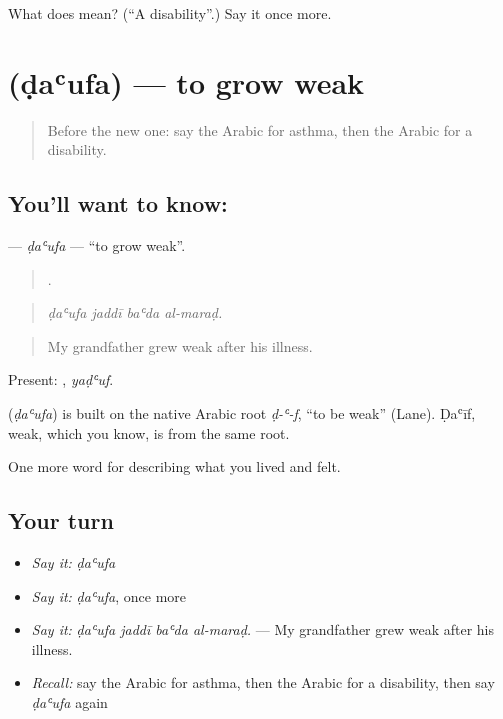 \begin{tcolorbox}[breakable,colback=teal!4,colframe=teal!35!black,title={Before you move on}]
What does  mean? (\textquotedblleft{}A disability\textquotedblright{}.) Say it once more.
\end{tcolorbox}
\section[\texorpdfstring{\ar{ضعف} (ḍaʿufa)}{ضعف (ḍaʿufa)}]{ (ḍaʿufa) — to grow weak}

\label{lesson:AR-C513-daufa}



\begin{quote}
Before the new one: say the Arabic for asthma, then the Arabic for a disability.
\end{quote}

\subsection*{You'll want to know: }
\textbf{} — \emph{ḍaʿufa} — \textquotedblleft{}to grow weak\textquotedblright{}.

\begin{quote}
   .
\end{quote}

\begin{quote}
\emph{ḍaʿufa jaddī baʿda al-maraḍ.}
\end{quote}

\begin{quote}
My grandfather grew weak after his illness.
\end{quote}

Present: , \emph{yaḍʿuf}.

\begin{cousinweb}
\textbf{} (\emph{ḍaʿufa}) is built on the native Arabic root \emph{ḍ-ʿ-f}, \textquotedblleft{}to be weak\textquotedblright{} (Lane). Ḍaʿīf, weak, which you know, is from the same root.
\end{cousinweb}

\begin{grammarlens}[title={What you've built}]
One more word for describing what you lived and felt.
\end{grammarlens}

\subsection*{Your turn}
\begin{itemize}
\raggedright
  \item \emph{Say it:} \emph{ḍaʿufa}
  \item \emph{Say it:} \emph{ḍaʿufa}, once more
  \item \emph{Say it:} \emph{ḍaʿufa jaddī baʿda al-maraḍ.} — My grandfather grew weak after his illness.
  \item \emph{Recall:} say the Arabic for asthma, then the Arabic for a disability, then say \emph{ḍaʿufa} again
\end{itemize}


